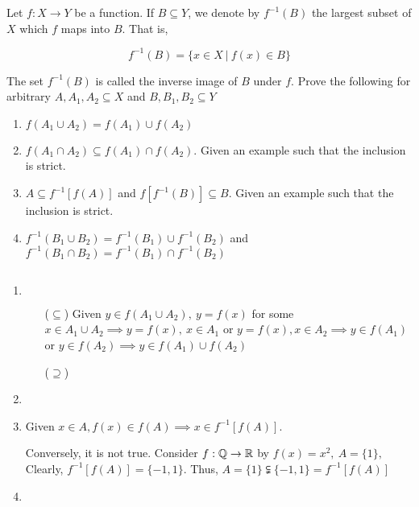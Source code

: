 Let $f:X \rightarrow Y$ be a function. If $B \subseteq Y$, we denote by $f^{-1}(B)$ the largest subset of $X$ which $f$ maps into $B$. That is,

$$f^{-1}(B) = \{x \in X ~|~ f(x) \in B\}$$

The set $f^{-1}(B)$ is called the inverse image of $B$ under $f$. Prove the following for arbitrary $A,A_1,A_2 \subseteq X$ and $B,B_1,B_2 \subseteq Y$

\begin{enumerate}
	\item $f(A_1 \cup A_2) = f(A_1) \cup f(A_2)$
	\item $f(A_1 \cap A_2) \subseteq f(A_1) \cap f(A_2)$. Given an example such that the inclusion is strict.
	\item $A \subseteq f^{-1}[f(A)]$ and $f[f^{-1}(B)] \subseteq B$. Given an example such that the inclusion is strict.
	\item $f^{-1}(B_1 \cup B_2) = f^{-1}(B_1) \cup f^{-1}(B_2)$ and $f^{-1} (B_1 \cap B_2) = f^{-1}(B_1) \cap f^{-1}(B_2)$
\end{enumerate}

\begin{tcolorbox}
	\begin{solution}$ $
		\begin{enumerate}[wide]
			\item $ $ 
			\begin{enumerate}
				\item[($\subseteq$)] Given $y \in f(A_1 \cup A_2),~y = f(x)$ for some $x \in A_1 \cup A_2 \implies y = f(x),~x \in A_1$ or $y = f(x),x \in A_2 \implies y \in f(A_1)$ or $y \in f(A_2) \implies y \in f(A_1) \cup f(A_2)$
				\item[($\supseteq$)] 
			\end{enumerate}
			\item 
			\item Given $x \in A,f(x) \in f(A) \implies x \in f^{-1}[f(A)]$.
			
			Conversely, it is not true. Consider $f: \mathbb{Q} \rightarrow \mathbb{R}$ by $f(x) = x^2,~A = \{1\},$ Clearly, $f^{-1}[f(A)] = \{-1,1\}$. Thus, $A = \{1\} \subsetneqq \{-1,1\} = f^{-1}[f(A)]$
			\item 
			
		\end{enumerate}
	\end{solution}
\end{tcolorbox}